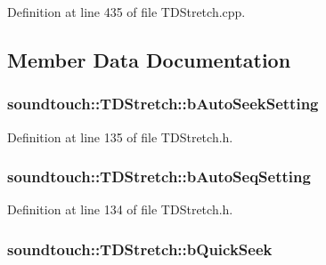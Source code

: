 Definition at line 435 of file T\+D\+Stretch.\+cpp.



\subsection{Member Data Documentation}
\subsubsection[{\texorpdfstring{b\+Auto\+Seek\+Setting}{bAutoSeekSetting}}]{ soundtouch\+::\+T\+D\+Stretch\+::b\+Auto\+Seek\+Setting\hspace{0.3cm}{\ttfamily [protected]}}\hypertarget{classsoundtouch_1_1_t_d_stretch_a8b241cf654e8c29b7ff7af3f359866a7}{}\label{classsoundtouch_1_1_t_d_stretch_a8b241cf654e8c29b7ff7af3f359866a7}


Definition at line 135 of file T\+D\+Stretch.\+h.

\subsubsection[{\texorpdfstring{b\+Auto\+Seq\+Setting}{bAutoSeqSetting}}]{ soundtouch\+::\+T\+D\+Stretch\+::b\+Auto\+Seq\+Setting\hspace{0.3cm}{\ttfamily [protected]}}\hypertarget{classsoundtouch_1_1_t_d_stretch_a9a52a469732c4f5e884d62b5eabebc6e}{}\label{classsoundtouch_1_1_t_d_stretch_a9a52a469732c4f5e884d62b5eabebc6e}


Definition at line 134 of file T\+D\+Stretch.\+h.

\subsubsection[{\texorpdfstring{b\+Quick\+Seek}{bQuickSeek}}]{ soundtouch\+::\+T\+D\+Stretch\+::b\+Quick\+Seek\hspace{0.3cm}{\ttfamily [protected]}}\hypertarget{classsoundtouch_1_1_t_d_stretch_aeb8664ce8d3bd7b625b25273a5032045}{}\label{classsoundtouch_1_1_t_d_stretch_aeb8664ce8d3bd7b625b25273a5032045}


